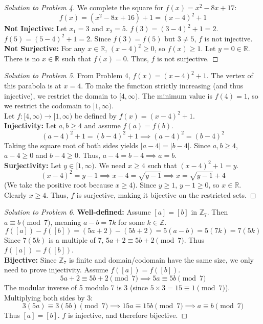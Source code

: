 \documentclass[11pt, letterpaper]{article}
\theoremstyle{definition}
\theoremstyle{remark}
\newcommand{\R}{\mathbb{R}}
\newcommand{\Z}{\mathbb{Z}}
\begin{document}
\begin{proof}[Solution to Problem 4]
We complete the square for $f(x) = x^2 - 8x + 17$:
\[ f(x) = (x^2 - 8x + 16) + 1 = (x - 4)^2 + 1 \]
\textbf{Not Injective:} Let $x_1 = 3$ and $x_2 = 5$. $f(3) = (3-4)^2 + 1 = 2$. $f(5) = (5-4)^2 + 1 = 2$. Since $f(3) = f(5)$ but $3 \neq 5$, $f$ is not injective. \\
\textbf{Not Surjective:} For any $x \in \R$, $(x-4)^2 \ge 0$, so $f(x) \ge 1$. Let $y = 0 \in \R$. There is no $x \in \R$ such that $f(x) = 0$. Thus, $f$ is not surjective.
\end{proof}

\begin{proof}[Solution to Problem 5]
From Problem 4, $f(x) = (x-4)^2 + 1$. The vertex of this parabola is at $x = 4$. To make the function strictly increasing (and thus injective), we restrict the domain to $[4, \infty)$. The minimum value is $f(4) = 1$, so we restrict the codomain to $[1, \infty)$. \\
Let $f : [4, \infty) \to [1, \infty)$ be defined by $f(x) = (x-4)^2 + 1$. \\
\textbf{Injectivity:} Let $a, b \ge 4$ and assume $f(a) = f(b)$.
\[ (a-4)^2 + 1 = (b-4)^2 + 1 \implies (a-4)^2 = (b-4)^2 \]
Taking the square root of both sides yields $|a-4| = |b-4|$. Since $a, b \ge 4$, $a-4 \ge 0$ and $b-4 \ge 0$. Thus, $a-4 = b-4 \implies a = b$. \\
\textbf{Surjectivity:} Let $y \in [1, \infty)$. We need $x \ge 4$ such that $(x-4)^2 + 1 = y$.
\[ (x-4)^2 = y - 1 \implies x - 4 = \sqrt{y-1} \implies x = \sqrt{y-1} + 4 \]
(We take the positive root because $x \ge 4$). Since $y \ge 1$, $y-1 \ge 0$, so $x \in \R$. Clearly $x \ge 4$. Thus, $f$ is surjective, making it bijective on the restricted sets.
\end{proof}

\begin{proof}[Solution to Problem 6]
\textbf{Well-defined:} Assume $[a] = [b]$ in $\Z_7$. Then $a \equiv b \pmod 7$, meaning $a - b = 7k$ for some $k \in \Z$.
\[ f([a]) - f([b]) = (5a + 2) - (5b + 2) = 5(a - b) = 5(7k) = 7(5k) \]
Since $7(5k)$ is a multiple of 7, $5a+2 \equiv 5b+2 \pmod 7$. Thus $f([a]) = f([b])$. \\
\textbf{Bijective:} Since $\Z_7$ is finite and domain/codomain have the same size, we only need to prove injectivity. Assume $f([a]) = f([b])$.
\[ 5a + 2 \equiv 5b + 2 \pmod 7 \implies 5a \equiv 5b \pmod 7 \]
The modular inverse of 5 modulo 7 is 3 (since $5 \times 3 = 15 \equiv 1 \pmod 7$). Multiplying both sides by 3:
\[ 3(5a) \equiv 3(5b) \pmod 7 \implies 15a \equiv 15b \pmod 7 \implies a \equiv b \pmod 7 \]
Thus $[a] = [b]$. $f$ is injective, and therefore bijective.
\end{proof}
\end{document}
